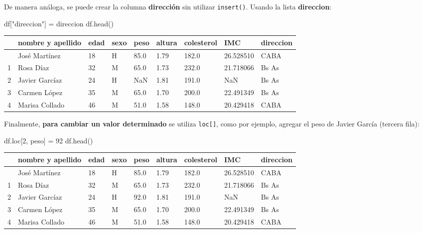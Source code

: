 \documentclass[
  letterpaper,
  DIV=11,
  numbers=noendperiod]{scrreprt}
\newenvironment{Shaded}{\begin{snugshade}}{\end{snugshade}}
\newcommand{\DecValTok}[1]{\textcolor[rgb]{0.68,0.00,0.00}{#1}}
\newcommand{\NormalTok}[1]{\textcolor[rgb]{0.00,0.23,0.31}{#1}}
\newcommand{\OperatorTok}[1]{\textcolor[rgb]{0.37,0.37,0.37}{#1}}
\newcommand{\StringTok}[1]{\textcolor[rgb]{0.13,0.47,0.30}{#1}}
\begin{document}
De manera análoga, se puede crear la columna \textbf{dirección} sin
utilizar \texttt{insert()}. Usando la lista \textbf{direccion}:

\begin{Shaded}
\begin{Highlighting}[]
\NormalTok{df[}\StringTok{"direccion"}\NormalTok{] }\OperatorTok{=}\NormalTok{ direccion}
\NormalTok{df.head()}
\end{Highlighting}
\end{Shaded}

\begin{longtable}[]{@{}lllllllll@{}}
\toprule\noalign{}
& nombre y apellido & edad & sexo & peso & altura & colesterol & IMC &
direccion \\
\midrule\noalign{}
\endhead
\bottomrule\noalign{}
\endlastfoot
0 & José Martínez & 18 & H & 85.0 & 1.79 & 182.0 & 26.528510 & CABA \\
1 & Rosa Díaz & 32 & M & 65.0 & 1.73 & 232.0 & 21.718066 & Bs As \\
2 & Javier Garcíaz & 24 & H & NaN & 1.81 & 191.0 & NaN & Bs As \\
3 & Carmen López & 35 & M & 65.0 & 1.70 & 200.0 & 22.491349 & Bs As \\
4 & Marisa Collado & 46 & M & 51.0 & 1.58 & 148.0 & 20.429418 & CABA \\
\end{longtable}

Finalmente, \textbf{para cambiar un valor determinado} se utiliza
\texttt{loc{[}{]}}, como por ejemplo, agregar el peso de Javier García
(tercera fila):

\begin{Shaded}
\begin{Highlighting}[]
\NormalTok{df.loc[}\DecValTok{2}\NormalTok{, }\StringTok{\textquotesingle{}peso\textquotesingle{}}\NormalTok{] }\OperatorTok{=} \DecValTok{92}
\NormalTok{df.head()}
\end{Highlighting}
\end{Shaded}

\begin{longtable}[]{@{}lllllllll@{}}
\toprule\noalign{}
& nombre y apellido & edad & sexo & peso & altura & colesterol & IMC &
direccion \\
\midrule\noalign{}
\endhead
\bottomrule\noalign{}
\endlastfoot
0 & José Martínez & 18 & H & 85.0 & 1.79 & 182.0 & 26.528510 & CABA \\
1 & Rosa Díaz & 32 & M & 65.0 & 1.73 & 232.0 & 21.718066 & Bs As \\
2 & Javier Garcíaz & 24 & H & 92.0 & 1.81 & 191.0 & NaN & Bs As \\
3 & Carmen López & 35 & M & 65.0 & 1.70 & 200.0 & 22.491349 & Bs As \\
4 & Marisa Collado & 46 & M & 51.0 & 1.58 & 148.0 & 20.429418 & CABA \\
\end{longtable}
\end{document}
